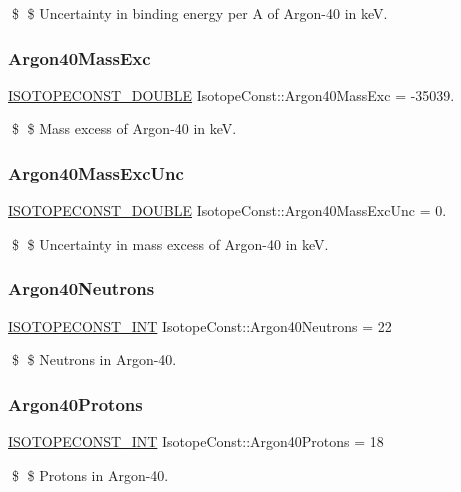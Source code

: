 \$ \$ Uncertainty in binding energy per A of Argon-\/40 in keV. \mbox{\label{group___isotope_const-_argon-_ar40_ga6c2641fd396df3e95e37e1ad6f6f9f88}} 
\subsubsection{\texorpdfstring{Argon40\+Mass\+Exc}{Argon40MassExc}}
{\footnotesize\ttfamily \mbox{\hyperlink{group___isotope_const-_macros_ga8f45a7272ce02c0b4c65c44636ed719a}{I\+S\+O\+T\+O\+P\+E\+C\+O\+N\+S\+T\+\_\+\+D\+O\+U\+B\+LE}} Isotope\+Const\+::\+Argon40\+Mass\+Exc = -\/35039.}

\$ \$ Mass excess of Argon-\/40 in keV. \mbox{\label{group___isotope_const-_argon-_ar40_gaa589e1ce4822f3869240aba294385162}} 
\subsubsection{\texorpdfstring{Argon40\+Mass\+Exc\+Unc}{Argon40MassExcUnc}}
{\footnotesize\ttfamily \mbox{\hyperlink{group___isotope_const-_macros_ga8f45a7272ce02c0b4c65c44636ed719a}{I\+S\+O\+T\+O\+P\+E\+C\+O\+N\+S\+T\+\_\+\+D\+O\+U\+B\+LE}} Isotope\+Const\+::\+Argon40\+Mass\+Exc\+Unc = 0.}

\$ \$ Uncertainty in mass excess of Argon-\/40 in keV. \mbox{\label{group___isotope_const-_argon-_ar40_gacb4850c20ea033f43fb2d509897ffb98}} 
\subsubsection{\texorpdfstring{Argon40\+Neutrons}{Argon40Neutrons}}
{\footnotesize\ttfamily \mbox{\hyperlink{group___isotope_const-_macros_ga5f18360b3e99483a35c32d789e62621c}{I\+S\+O\+T\+O\+P\+E\+C\+O\+N\+S\+T\+\_\+\+I\+NT}} Isotope\+Const\+::\+Argon40\+Neutrons = 22}

\$ \$ Neutrons in Argon-\/40. \mbox{\label{group___isotope_const-_argon-_ar40_ga27beff1de1ae0c53eb6733bb7d253f40}} 
\subsubsection{\texorpdfstring{Argon40\+Protons}{Argon40Protons}}
{\footnotesize\ttfamily \mbox{\hyperlink{group___isotope_const-_macros_ga5f18360b3e99483a35c32d789e62621c}{I\+S\+O\+T\+O\+P\+E\+C\+O\+N\+S\+T\+\_\+\+I\+NT}} Isotope\+Const\+::\+Argon40\+Protons = 18}

\$ \$ Protons in Argon-\/40. 